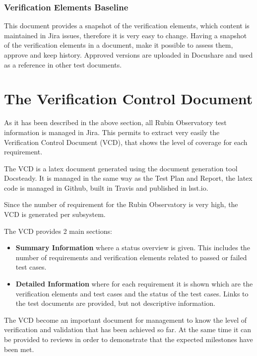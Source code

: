 \subsubsection{Verification Elements Baseline}

This document provides a snapshot of the verification elements, which content is maintained in Jira issues, therefore it is very easy to change.
Having a snapshot of the verification elements in a document, make it possible to assess them, approve and keep history.
Approved versions are uploaded in Docushare and used as a reference in other test documents.


\section{The Verification Control Document}

As it has been described in the above section, all Rubin Observatory test information is managed in Jira. 
This permits to extract very easily the Verification Control Document (VCD), that shows the level of coverage for each requirement.

The VCD is a latex document generated using the document generation tool Docsteady. 
It is managed in the same way as the Test Plan and Report, the latex code is managed in Github,
built in Travis and published in lsst.io.

Since the number of requirement for the Rubin Observatory is very high, the VCD is generated per subsystem.

The VCD provides 2 main sections:

\begin{itemize}
\item \textbf{Summary Information} where a status overview is given. 
This includes the number of requirements and verification elements related to passed or failed test cases.
\item \textbf{Detailed Information} where for each requirement it is shown which are the verification elements and test cases
and the status of the test cases. Links to the test documents are provided, but not descriptive information.
\end{itemize}

The VCD become an important document for management to know the level of verification and validation that has been achieved so far.
At the same time it can be provided to reviews in order to demonstrate that the expected milestones have been met.


